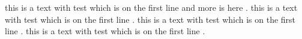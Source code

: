 this is a text with test \cite{line1} which is on the first line \cite{line11,line111} and more is here \cite{line3,line33,line333,line3333}.
this is a text with test \cite{coffee3} which is on the first line \cite{coffee33,coffee333}.
this is a text with test \cite{dogger1} which is on the first line \cite{dogger11,dogger111}.
this is a text with test \cite{mega2} which is on the first line \cite{mega22,mega222}.



